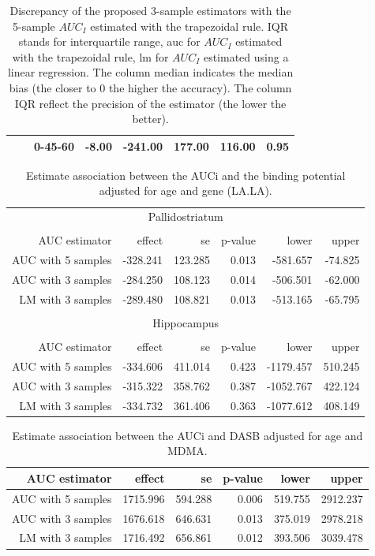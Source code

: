 \documentclass[12pt]{article}
\begin{document}
\begin{table}[ht]
\begin{tabular}{lllrrrrr}
   &  & 0-45-60 & -8.00 & -241.00 & 177.00 & 116.00 & 0.95 \\ 
   \hline
\end{tabular}
\caption{Discrepancy of the proposed 3-sample estimators with the 5-sample \(AUC_I\) estimated with the trapezoidal rule.
IQR stands for interquartile range, auc for \(AUC_I\) estimated with the trapezoidal rule, lm for \(AUC_I\) estimated using a linear regression.
The column median indicates the median bias (the closer to 0 the higher the accuracy).
The column IQR reflect the precision of the estimator (the lower the better).}
\label{tab:AUCi-perfEstimator}
\end{table}


\begin{table}[!h]
\centering
\begin{tabular}{rrrrrr}
  \hline \multicolumn{6}{c}{Pallidostriatum}  \\
  \\
AUC estimator       & effect   & se      & p-value & lower & upper \\ \hline
AUC with 5 samples & -328.241 & 123.285 & 0.013 & -581.657 & -74.825 \\ 
  AUC with 3 samples & -284.250 & 108.123 & 0.014 & -506.501 & -62.000 \\ 
  LM with 3 samples & -289.480 & 108.821 & 0.013 & -513.165 & -65.795 \\ 
  \hline \\
\hline
\multicolumn{6}{c}{Hippocampus} \\
    \\ 
AUC estimator       & effect   & se      & p-value & lower & upper \\ \hline
AUC with 5 samples & -334.606 & 411.014 & 0.423 & -1179.457 & 510.245 \\ 
  AUC with 3 samples & -315.322 & 358.762 & 0.387 & -1052.767 & 422.124 \\ 
  LM with 3 samples & -334.732 & 361.406 & 0.363 & -1077.612 & 408.149 \\ 
  \hline
\end{tabular}
\caption{Estimate association between the AUCi and the binding potential adjusted for age and gene (LA.LA).}
\label{tab:Jak2016}
\end{table}

\begin{table}[!h]
\centering
\begin{tabular}{rrrrrr}
AUC estimator       & effect   & se      & p-value & lower & upper \\ \hline
AUC with 5 samples & 1715.996 & 594.288 & 0.006 & 519.755 & 2912.237 \\ 
  AUC with 3 samples & 1676.618 & 646.631 & 0.013 & 375.019 & 2978.218 \\ 
  LM with 3 samples & 1716.492 & 656.861 & 0.012 & 393.506 & 3039.478 \\ 
  \hline
\end{tabular}
\caption{Estimate association between the AUCi and DASB adjusted for age and MDMA.}
\label{tab:Fro2014}
\end{table}
\end{document}
